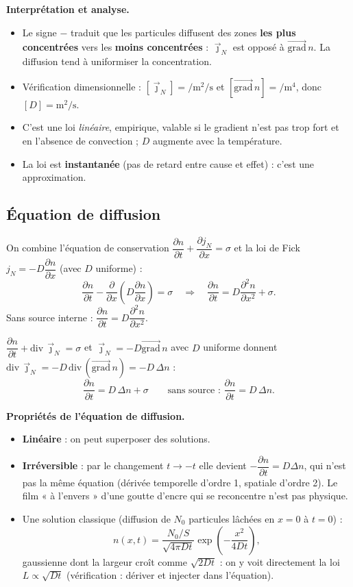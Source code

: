 \documentclass[11pt,a4paper]{article}
\newcommand{\vect}[1]{\overrightarrow{#1}}
\newcommand{\jn}{\vec{\jmath}_N}
\newcommand{\grad}{\vect{\mathrm{grad}}\,}
\renewcommand{\div}{\mathrm{div}\,}
\newcommand{\pd}[2]{\dfrac{\partial #1}{\partial #2}}
\newcommand{\pdd}[2]{\dfrac{\partial^2 #1}{\partial #2^2}}
\begin{document}
\textbf{Interprétation et analyse.}
\begin{itemize}[leftmargin=1.5em]
  \item Le signe $-$ traduit que les particules diffusent des zones \textbf{les plus concentrées}
        vers les \textbf{moins concentrées} : $\jn$ est opposé à $\grad n$. La diffusion tend à
        uniformiser la concentration.
  \item Vérification dimensionnelle : $[\jn]=\si{\per\square\metre\per\second}$ et
        $[\grad n]=\si{\per\metre\tothe{4}}$, donc $[D]=\si{\square\metre\per\second}$.
  \item C'est une loi \emph{linéaire}, empirique, valable si le gradient n'est pas trop fort
        et en l'absence de convection ; $D$ augmente avec la température.
  \item La loi est \textbf{instantanée} (pas de retard entre cause et effet) : c'est une
        approximation.
\end{itemize}

\subsection{Équation de diffusion}

\begin{demo}[title={Démonstration : équation de diffusion à 1D}]
On combine l'équation de conservation $\pd{n}{t}+\pd{j_N}{x}=\sigma$ et la loi de Fick
$j_N=-D\pd{n}{x}$ (avec $D$ uniforme) :
\[ \pd{n}{t} - \pd{}{x}\!\left(D\pd{n}{x}\right)=\sigma
   \quad\Longrightarrow\quad
   \boxed{\pd{n}{t}=D\pdd{n}{x}+\sigma}. \]
Sans source interne : $\pd{n}{t}=D\pdd{n}{x}$.
\end{demo}

\begin{demo}[title={Démonstration : équation de diffusion à 3D}]
$\pd{n}{t}+\div\jn=\sigma$ et $\jn=-D\grad n$ avec $D$ uniforme donnent
$\div\jn=-D\,\div(\grad n)=-D\,\Delta n$ :
\[ \boxed{\pd{n}{t}=D\,\Delta n+\sigma} \qquad\text{sans source : }\pd{n}{t}=D\,\Delta n. \]
\end{demo}

\textbf{Propriétés de l'équation de diffusion.}
\begin{itemize}[leftmargin=1.5em]
  \item \textbf{Linéaire} : on peut superposer des solutions.
  \item \textbf{Irréversible} : par le changement $t\to -t$ elle devient
        $-\pd{n}{t}=D\Delta n$, qui n'est pas la même équation (dérivée temporelle d'ordre 1,
        spatiale d'ordre 2). Le film « à l'envers » d'une goutte d'encre qui se reconcentre
        n'est pas physique.
  \item Une solution classique (diffusion de $N_0$ particules lâchées en $x=0$ à $t=0$) :
        \[ n(x,t)=\dfrac{N_0/S}{\sqrt{4\pi Dt}}\exp\!\left(-\dfrac{x^2}{4Dt}\right), \]
        gaussienne dont la largeur croît comme $\sqrt{2Dt}$ : on y voit directement la loi
        $L\propto\sqrt{Dt}$ (vérification : dériver et injecter dans l'équation).
\end{itemize}
\end{document}
